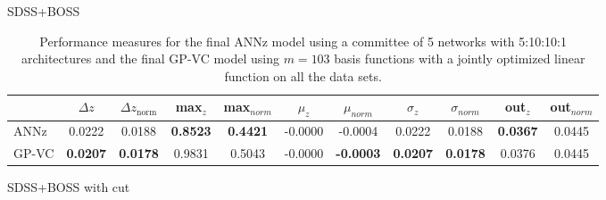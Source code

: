 \documentclass[useAMS,usenatbib,fleqn]{mn2e}
\begin{document}
\begin{center}
\begin{table}
\begin{subtable}{\textwidth}
\caption{SDSS+BOSS}
\label{table-final-results-boss}
\end{subtable}

\begin{subtable}{\textwidth}
\centering

\begin{tabular}{| l | c | c |  c | c |  c | c |  c | c |  c | c | }
     				&	$\Delta z$	&	$\Delta z_\textrm{norm}$	&	max$_{z}$ & max$_{norm}$		&	$\mu_{z}$&	$\mu_{norm}$	& $\sigma_{z}$ & $\sigma_{norm}$ & out$_{z}$&out$_{norm}$\\	\hline
	{\sc ANNz}		&	0.0222	&	0.0188		&	\textbf{0.8523}		&	\textbf{0.4421}&	-0.0000		&	-0.0004 &	0.0222		&	0.0188&	\textbf{0.0367}		&	0.0445\\
	{\sc GP-VC } 	&	\textbf{0.0207} 	&	\textbf{0.0178}		&	0.9831	&	0.5043 & -0.0000		&	\textbf{-0.0003}&	\textbf{0.0207}		&	\textbf{0.0178}&	0.0376 	&	0.0445\\\hline
  \end{tabular}

\caption{SDSS+BOSS with cut}
\label{table-final-results-boss-cut}
\end{subtable}


\caption{Performance measures for the final {\sc ANNz} model using a committee of 5 networks with 5:10:10:1 architectures and the final GP-VC model using $m=103$ basis functions with a jointly optimized linear function on all the data sets.}
\label{table-final-results}
\end{table}
\end{center}
\end{document}
